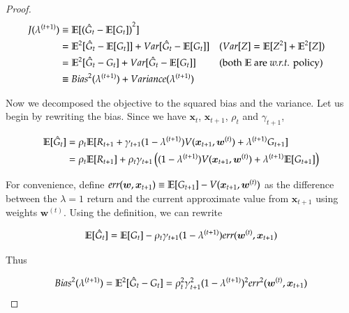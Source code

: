 \begin{proof}
\begin{equation}
\begin{aligned}
J(\lambda^{(t+1)}) & \equiv \mathbb{E}[{(\hat{G}_t - \mathbb{E}[G_t])}^2]\\
& = \mathbb{E}^2[\hat{G}_t - \mathbb{E}[G_t]] + Var[\hat{G}_t - \mathbb{E}[G_t]] && \text{($Var[Z] = \mathbb{E}[Z^2] + \mathbb{E}^2[Z]$)}\\
& = \mathbb{E}^2[\hat{G}_t - G_t] + Var[\hat{G}_t - \mathbb{E}[G_t]] && \text{(both $\mathbb{E}$ are \textit{w.r.t.}{} policy)}\\
& \equiv {Bias}^2(\lambda^{(t+1)}) + {Variance}(\lambda^{(t+1)})
\end{aligned}  
\end{equation}

Now we decomposed the objective to the squared bias and the variance. Let us begin by rewriting the bias. Since we have $\bm{x}_t$, $\bm{x}_{t+1}$, $\rho_t$ and $\gamma_{t+1}$,

\begin{equation}
\begin{aligned}
\mathbb{E}[\hat{G}_t] & = \rho_t \mathbb{E}[R_{t+1} + \gamma_{t+1}(1-\lambda^{(t+1)})V(\bm{x}_{t+1}, \bm{w}^{(t)}) + \lambda^{(t+1)} G_{t+1}]\\
& = \rho_t \mathbb{E}[R_{t+1}] + \rho_t \gamma_{t+1} \left((1-\lambda^{(t+1)})V(\bm{x}_{t+1}, \bm{w}^{(t)}) + \lambda^{(t+1)} \mathbb{E}[G_{t+1}]\right)
\end{aligned}
\end{equation}

For convenience, define $err(\bm{w}, \bm{x}_{t+1}) \equiv \mathbb{E}[G_{t+1}] - V(\bm{x}_{t+1}, \bm{w}^{(t)})$ as the difference between the $\lambda = 1$ return and the current approximate value from $\bm{x}_{t+1}$ using weights $\bm{w}^{(t)}$. Using the definition, we can rewrite

\begin{equation}
\mathbb{E}[\hat{G}_t] = \mathbb{E}[G_t] - \rho_t \gamma_{t+1} (1-\lambda^{(t+1)})err(\bm{w}^{(t)}, \bm{x}_{t+1})
\end{equation}

Thus

\begin{equation}
{Bias}^2(\lambda^{(t+1)}) = \mathbb{E}^2[\hat{G}_t - G_t] = \rho_t^2 \gamma_{t+1}^2 (1 - \lambda^{(t+1)})^2 {err}^2(\bm{w}^{(t)}, \bm{x}_{t+1})
\end{equation}


\end{proof}
